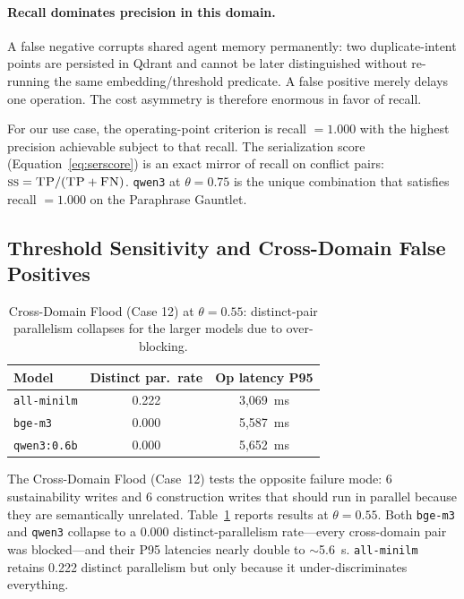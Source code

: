 \documentclass[sigconf]{acmart}
\begin{document}
\paragraph{Recall dominates precision in this domain.}
A false negative corrupts shared agent memory permanently: two
duplicate-intent points are persisted in Qdrant and cannot be later
distinguished without re-running the same embedding/threshold
predicate. A false positive merely delays one operation. The cost
asymmetry is therefore enormous in favor of recall.

For our use case, the operating-point criterion is recall $=1.000$
with the highest precision achievable subject to that recall. The
serialization score (Equation~\ref{eq:serscore}) is an exact mirror of
recall on conflict pairs: $\textsc{ss}=\textsc{TP}/(\textsc{TP}+
\textsc{FN})$. \texttt{qwen3} at $\theta=0.75$ is the unique
combination that satisfies recall $=1.000$ on the Paraphrase Gauntlet.

\subsection{Threshold Sensitivity and Cross-Domain False Positives}
\label{sec:emb-flood}

\begin{table}[t]
  \centering
  \caption{Cross-Domain Flood (Case 12) at $\theta=0.55$:
    distinct-pair parallelism collapses for the larger models due to
    over-blocking.}
  \label{tab:flood}
  \small
  \begin{tabular}{lcc}
    \toprule
    Model & Distinct par.\ rate & Op latency P95 \\
    \midrule
    \texttt{all-minilm}   & 0.222 & 3{,}069~ms \\
    \texttt{bge-m3}       & 0.000 & 5{,}587~ms \\
    \texttt{qwen3:0.6b}   & 0.000 & 5{,}652~ms \\
    \bottomrule
  \end{tabular}
\end{table}

The Cross-Domain Flood (Case~12) tests the opposite failure mode: 6
sustainability writes and 6 construction writes that should run in
parallel because they are semantically unrelated.
Table~\ref{tab:flood} reports results at $\theta=0.55$. Both \texttt{bge-m3}
and \texttt{qwen3} collapse to a 0.000 distinct-parallelism rate---every
cross-domain pair was blocked---and their P95 latencies nearly double to
$\sim$5.6~s. \texttt{all-minilm} retains 0.222 distinct parallelism but
only because it under-discriminates everything.
\end{document}
